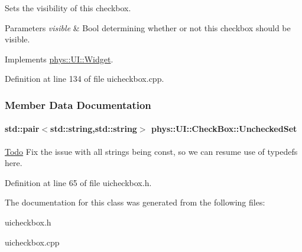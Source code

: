 Sets the visibility of this checkbox. 


\begin{DoxyParams}{Parameters}
{\em visible} & Bool determining whether or not this checkbox should be visible. \\
\hline
\end{DoxyParams}


Implements \hyperlink{classphys_1_1UI_1_1Widget_ab049233d8d5522a6ab42654b8924a3e0}{phys::UI::Widget}.



Definition at line 134 of file uicheckbox.cpp.



\subsubsection{Member Data Documentation}
\hypertarget{classphys_1_1UI_1_1CheckBox_a7b670d93f119193283ec78b94f842429}{
\paragraph[{UncheckedSet}]{\setlength{\rightskip}{0pt plus 5cm}std::pair$<$std::string,std::string$>$ {\bf phys::UI::CheckBox::UncheckedSet}}\hfill}
\label{classphys_1_1UI_1_1CheckBox_a7b670d93f119193283ec78b94f842429}
\begin{Desc}
\item[\hyperlink{todo__todo000028}{Todo}]Fix the issue with all strings being const, so we can resume use of typedefs here. \end{Desc}


Definition at line 65 of file uicheckbox.h.



The documentation for this class was generated from the following files:\begin{DoxyCompactItemize}
\item 
uicheckbox.h\item 
uicheckbox.cpp\end{DoxyCompactItemize}
